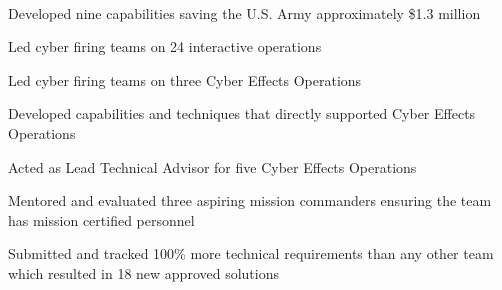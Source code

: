 \documentclass[]{resume}
\begin{document}
\begin{minipage}[t]{0.69\textwidth}
 \\
\begin{tightemize}
\item Developed nine capabilities saving the U.S. Army approximately \$1.3 million
\item Led cyber firing teams on 24 interactive operations
\item Led cyber firing teams on three Cyber Effects Operations
\item Developed capabilities and techniques that directly supported Cyber Effects Operations
\item Acted as Lead Technical Advisor for five Cyber Effects Operations
\item Mentored and evaluated three aspiring mission commanders ensuring the team has mission certified personnel
\item Submitted and tracked 100\% more technical requirements than any other team which resulted in 18 new approved solutions
\end{tightemize}

\sectionsep



\end{minipage}
\end{document}
